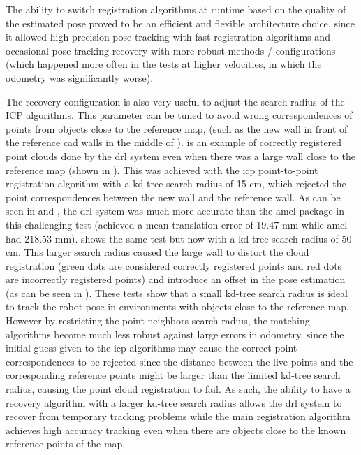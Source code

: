 The ability to switch registration algorithms at runtime based on the quality of the estimated pose proved to be an efficient and flexible architecture choice, since it allowed high precision pose tracking with fast registration algorithms and occasional pose tracking recovery with more robust methods / configurations (which happened more often in the tests at higher velocities, in which the odometry was significantly worse).

The recovery configuration is also very useful to adjust the search radius of the ICP algorithms. This parameter can be tuned to avoid wrong correspondences of points from objects close to the reference map, (such as the new wall in front of the reference \gls{cad} walls in the middle of ).  is an example of correctly registered point clouds done by the \gls{drl} system even when there was a large wall close to the reference map (shown in ). This was achieved with the \gls{icp} point-to-point registration algorithm with a kd-tree search radius of 15 cm, which rejected the point correspondences between the new wall and the reference wall. As can be seen in  and , the \gls{drl} system was much more accurate than the \gls{amcl} package in this challenging test (achieved a mean translation error of 19.47 mm while \gls{amcl} had 218.53 mm).  shows the same test but now with a kd-tree search radius of 50 cm. This larger search radius caused the large wall to distort the cloud registration (green dots are considered correctly registered points and red dots are incorrectly registered points) and introduce an offset in the pose estimation (as can be seen in ). These tests show that a small kd-tree search radius is ideal to track the robot pose in environments with objects close to the reference map. However by restricting the point neighbors search radius, the matching algorithms become much less robust against large errors in odometry, since the initial guess given to the \gls{icp} algorithms may cause the correct point correspondences to be rejected since the distance between the live points and the corresponding reference points might be larger than the limited kd-tree search radius, causing the point cloud registration to fail. As such, the ability to have a recovery algorithm with a larger kd-tree search radius allows the \gls{drl} system to recover from temporary tracking problems while the main registration algorithm achieves high accuracy tracking even when there are objects close to the known reference points of the map.


